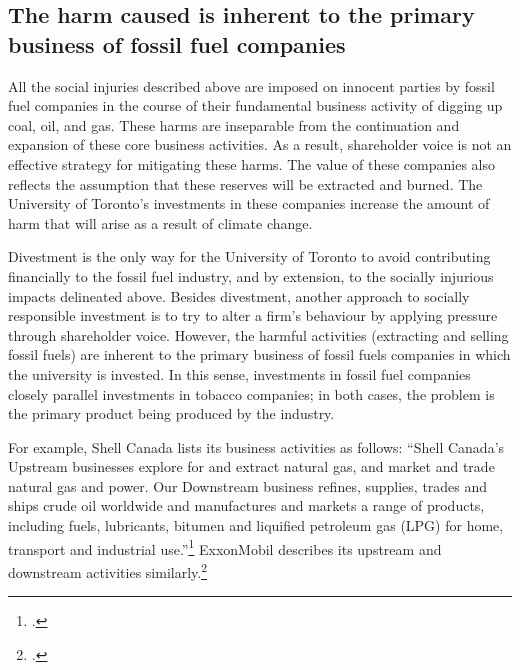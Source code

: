 	\subsection{The harm caused is inherent to the primary business of fossil fuel companies}



All the social injuries described above are imposed on innocent parties by fossil fuel companies in the course of their fundamental business activity of digging up coal, oil, and gas.
These harms are inseparable from the continuation and expansion of these core business activities.
As a result, shareholder voice is not an effective strategy for mitigating these harms. 
The value of these companies also reflects the assumption that these reserves will be extracted and burned.
The University of Toronto's investments in these companies increase the amount of harm that will arise as a result of climate change.



Divestment is the only way for the University of Toronto to avoid contributing financially to the fossil fuel industry, and by extension, to the socially injurious impacts delineated above.
Besides divestment, another approach to socially responsible investment is to try to alter a firm’s behaviour by applying pressure through shareholder voice. 
However, the harmful activities (extracting and selling fossil fuels) are inherent to the primary business of fossil fuels companies in which the university is invested.  
In this sense, investments in fossil fuel companies closely parallel investments in tobacco companies; in both cases, the problem is the primary product being produced by the industry.



For example, Shell Canada lists its business activities as follows: ``Shell Canada's Upstream businesses explore for and extract natural gas, and market and trade natural gas and power. Our Downstream business refines, supplies, trades and ships crude oil worldwide and manufactures and markets a range of products, including fuels, lubricants, bitumen and liquified petroleum gas (LPG) for home, transport and industrial use.''\footcite[][]{ShellAtAGlance}
ExxonMobil describes its upstream and downstream activities similarly.\footcite[][]{ExxonWhatWeDo}



